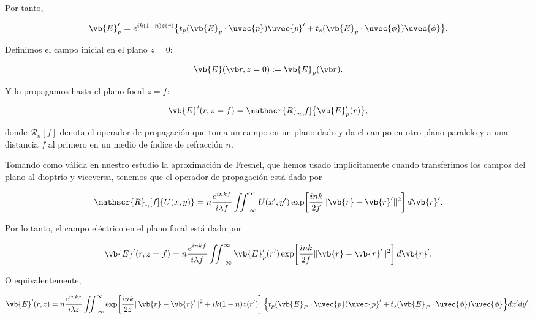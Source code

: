 Por tanto,

\begin{equation}
    \vb{E}_p'
    =
    e^{ik(1-n)z(r)}
    \big\{
    t_p (\vb{E}_p \cdot \uvec{p}) \uvec{p}'
    +
    t_s (\vb{E}_p \cdot \uvec{\phi}) \uvec{\phi}
    \big\}.
\end{equation}

Definimos el campo inicial en el plano $z=0$:

\begin{equation}
    \vb{E}(\vb r, z=0)
    :=
    \vb{E}_p(\vb r).
\end{equation}

Y lo propagamos hasta el plano focal $z=f$:

\begin{equation}
    \vb{E}'(r, z=f)
    =
    \mathscr{R}_n [f] \big\{ \vb{E}_p'(r) \big\},
\end{equation}

donde $\mathscr R_n[f]$ denota el operador de propagación que toma un campo en un plano dado y da el campo en otro plano paralelo y a una distancia $f$ al primero en un medio de índice de refracción $n$.

Tomando como válida en nuestro estudio la aproximación de Fresnel, que hemos usado implícitamente cuando transferimos los campos del plano al dioptrío y viceversa, tenemos que el operador de propagación está dado por

\begin{equation}
    \mathscr{R}_n [f] \{ U(x,y) \}
    =
    n\frac{e^{inkf}}{i \lambda f}
    \iint_{-\infty}^{\infty}
    U(x',y')
    \exp\!\left[
        \frac{ink}{2f}
        \lVert \vb{r}-\vb{r}' \rVert^2
    \right]
    d\vb{r}'.
\end{equation}

Por lo tanto, el campo eléctrico en el plano focal está dado por

\begin{equation}
    \vb{E}'(r, z=f)
    =
    n\frac{e^{inkf}}{i \lambda f}
    \iint_{-\infty}^{\infty}
    \vb{E}_p'(r')
    \exp\!\left[
        \frac{ink}{2f}
        \lVert \vb{r}-\vb{r}' \rVert^2
    \right]
    d\vb{r}'.
\end{equation}

O equivalentemente,

\begin{equation}
    \vb{E}'(r, z)
    =
    n\frac{e^{inkz}}{i \lambda z}
    \iint_{-\infty}^{\infty}
    \exp\!\left[
        \frac{ink}{2z}
        \lVert \vb{r}-\vb{r}' \rVert^2
        +
        ik(1-n)z(r')
    \right]
    \Big\{
        t_p (\vb{E}_P \cdot \uvec{p}) \uvec{p}'
        +
        t_s (\vb{E}_P \cdot \uvec{\phi}) \uvec{\phi}
    \Big\}
    dx'dy'.
\label{eq:E_field_at_z_3D}
\end{equation}

